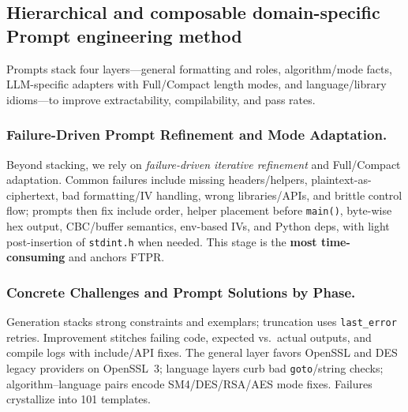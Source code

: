 \documentclass[12pt]{llncs}
\begin{document}
\subsection{Hierarchical and composable domain-specific Prompt engineering method}
Prompts stack four layers---general formatting and roles, algorithm/mode facts, LLM-specific adapters with Full/Compact length modes, and language/library idioms---to improve extractability, compilability, and pass rates.

\subsubsection{Failure-Driven Prompt Refinement and Mode Adaptation.}
Beyond stacking, we rely on \emph{failure-driven iterative refinement} and Full/Compact adaptation. Common failures include missing headers/helpers, plaintext-as-ciphertext, bad formatting/IV handling, wrong libraries/APIs, and brittle control flow; prompts then fix include order, helper placement before \texttt{main()}, byte-wise hex output, CBC/buffer semantics, env-based IVs, and Python deps, with light post-insertion of \texttt{stdint.h} when needed. This stage is the \textbf{most time-consuming} and anchors FTPR.

\subsubsection{Concrete Challenges and Prompt Solutions by Phase.}
\label{subsec:challenges_prompt_table}
Generation stacks strong constraints and exemplars; truncation uses \texttt{last\_error} retries. Improvement stitches failing code, expected vs.\ actual outputs, and compile logs with include/API fixes. The general layer favors OpenSSL and DES legacy providers on OpenSSL~3; language layers curb bad \texttt{goto}/string checks; algorithm--language pairs encode SM4/DES/RSA/AES mode fixes. Failures crystallize into 101 templates.
\end{document}
